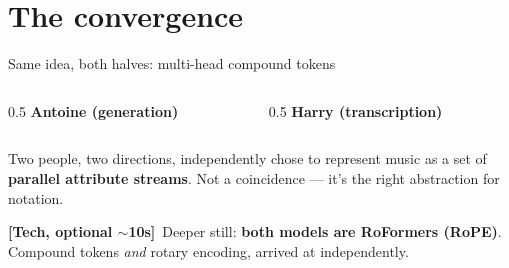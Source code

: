 \documentclass[aspectratio=169,11pt]{beamer}
\newcommand{\techtag}{{\color{labgreen}\footnotesize\textbf{[Tech, optional $\sim$10s]}}}
\begin{document}
\section{The convergence}

\begin{frame}{Same idea, both halves: multi-head compound tokens}
  \begin{columns}[T]
    \begin{column}{0.5\textwidth}
      \centering\textbf{\color{labblue}Antoine (generation)}\par\smallskip
    \end{column}
    \begin{column}{0.5\textwidth}
      \centering\textbf{\color{labblue}Harry (transcription)}\par\smallskip
    \end{column}
  \end{columns}
  \vspace{0.6em}
  \begin{block}{}\centering
    Two people, two directions, independently chose to represent music as a set of \textbf{parallel attribute streams}. Not a coincidence --- it's the right abstraction for notation.
  \end{block}
  \techtag\ \footnotesize Deeper still: \textbf{both models are RoFormers (RoPE)}. Compound tokens \emph{and} rotary encoding, arrived at independently.

\end{frame}
\end{document}

